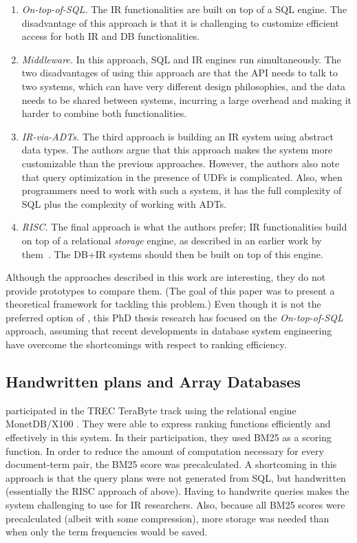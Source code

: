 \begin{enumerate}
	\item \emph{On-top-of-SQL.} The IR functionalities are built on top of a SQL engine. The disadvantage of this approach is that it is challenging to customize efficient access for both IR and DB functionalities. 
	\item \emph{Middleware.} In this approach, SQL and IR engines run simultaneously. The two disadvantages of using this approach are that the API needs to talk to two systems, which can have very different design philosophies, and the data needs to be shared between systems, incurring a large overhead and making it harder to combine both functionalities. 
	\item \emph{IR-via-ADTs.} The third approach is building an IR system using abstract data types. The authors argue that this approach makes the system more customizable than the previous approaches. However, the authors also note that query optimization in the presence of UDFs is complicated. Also, when programmers need to work with such a system, it has the full complexity of SQL plus the complexity of working with ADTs. 
	\item \emph{RISC.} The final approach is what the authors prefer; IR functionalities build on top of a relational \textit{storage} engine, as described in an earlier work by them~\citep{risc}. The DB+IR systems should then be built on top of this engine. 
\end{enumerate}  
Although the approaches described in this work are interesting, they do not provide prototypes to compare them. (The goal of this paper was to present a theoretical framework for tackling this problem.) Even though it is not the preferred option of \citeauthor{Chaudhuri2005IntegratingDA}, this PhD thesis research has focused on the \emph{On-top-of-SQL} approach, assuming that recent developments in database system engineering have overcome the shortcomings with respect to ranking efficiency.

\subsection{Handwritten plans and Array Databases}
 participated in the TREC TeraByte track using the relational engine MonetDB/X100 \citep{monetdb/x100}. They were able to express ranking functions efficiently and effectively in this system. In their participation, they used BM25 as a scoring function. In order to reduce the amount of computation necessary for every document-term pair, the BM25 score was precalculated. 
A shortcoming in this approach is that the query plans were not generated from SQL, but handwritten (essentially the RISC approach of above). Having to handwrite queries makes the system challenging to use for IR researchers. Also, because all BM25 scores were precalculated (albeit with some compression), more storage was needed than when only the term frequencies would be saved.

